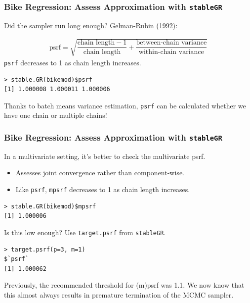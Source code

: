 \documentclass{beamer}
\begin{document}
\begin{frame}[fragile]
 \frametitle{ Bike Regression: Assess Approximation with \texttt{stableGR}    }
Did the sampler run long enough? Gelman-Rubin (1992): 


 \begin{align*} 
\text{psrf} = \sqrt{\dfrac{\text{chain length} -1}{\text{chain length}} + \dfrac{\text{between-chain variance}}{\text{within-chain variance}}} 
\end{align*}
\texttt{psrf} decreases to 1 as chain length increases. \pause

\begin{verbatim}
> stable.GR(bikemod)$psrf
[1] 1.000008 1.000011 1.000006
\end{verbatim}

\vfill

{\small Thanks to batch means variance estimation, \texttt{psrf} can be calculated whether we have one chain or multiple chains! }
\end{frame}

\begin{frame}[fragile]
 \frametitle{ Bike Regression: Assess Approximation with \texttt{stableGR}    }
In a multivariate setting, it's better to check the multivariate psrf. \\
\begin{itemize}
\item[]  Assesses joint convergence rather than component-wise.
\item[] Like \texttt{psrf}, \texttt{mpsrf} decreases to 1 as chain length increases. 
\end{itemize}

\begin{verbatim}
> stable.GR(bikemod)$mpsrf
[1] 1.000006
\end{verbatim}

\vspace{.3cm}

\pause

Is this low enough? Use \texttt{target.psrf} from \texttt{stableGR}.
\begin{verbatim}
> target.psrf(p=3, m=1)
$`psrf`
[1] 1.000062
\end{verbatim}

\vfill 

{\small Previously, the recommended threshold for (m)psrf was 1.1. We now know that this almost always results in premature termination of the MCMC sampler.   }

\end{frame}
\end{document}
